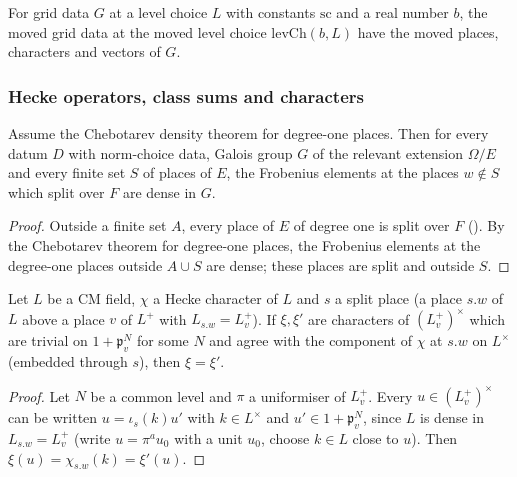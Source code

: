\begin{definition}\label{pf:stageU:gdc}
For grid data $G$ at a level choice $L$ with constants $\mathrm{sc}$ and a real number $b$, the moved grid data at the moved level choice
$\mathrm{levCh}(b,L)$ have the moved places, characters and vectors of $G$.
\end{definition}

\subsubsection{Hecke operators, class sums and characters}\label{sec:pf:stageU:hecke}

\begin{lemma}\label{pf:stageU:chebsplit}
Assume the Chebotarev density theorem for degree-one places. Then for every datum $D$ with norm-choice data, Galois group $G$ of
the relevant extension $\Omega/E$ and every finite set $S$ of places of $E$, the Frobenius elements at the places $w\notin S$ which
split over $F$ are dense in $G$.
\end{lemma}

\begin{proof}
Outside a finite set $A$, every place of $E$ of degree one is split over $F$ ().
By the Chebotarev theorem for degree-one places, the Frobenius elements at the degree-one places outside $A\cup S$ are dense; these
places are split and outside $S$.
\end{proof}

\begin{lemma}\label{pf:stageU:compat}
Let $L$ be a CM field, $\chi$ a Hecke character of $L$ and $s$ a split place (a place $s.w$ of $L$ above a place $v$ of $L^+$ with
$L_{s.w}=L^+_v$). If $\xi,\xi'$ are characters of $(L^+_v)^\times$ which are trivial on $1+\mathfrak p_v^N$ for some $N$ and agree with the
component of $\chi$ at $s.w$ on $L^\times$ (embedded through $s$), then $\xi=\xi'$.
\end{lemma}

\begin{proof}
Let $N$ be a common level and $\pi$ a uniformiser of $L^+_v$. Every $u\in(L^+_v)^\times$ can be written $u=\iota_s(k)u'$ with $k\in L^\times$ and
$u'\in1+\mathfrak p_v^N$, since $L$ is dense in $L_{s.w}=L^+_v$ (write $u=\pi^au_0$ with a unit $u_0$, choose $k\in L$ close to $u$). Then
$\xi(u)=\chi_{s.w}(k)=\xi'(u)$.
\end{proof}

